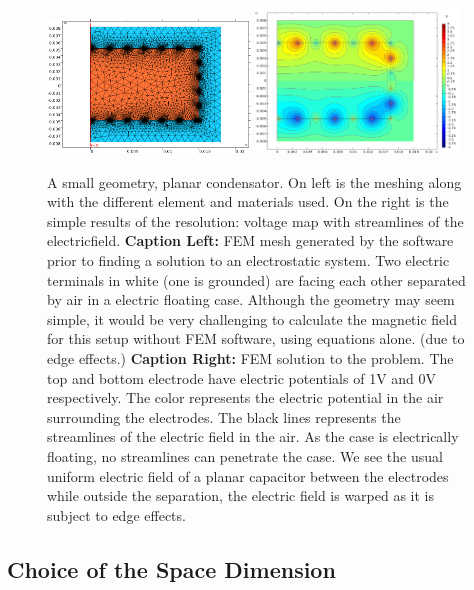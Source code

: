 \begin{figure}
\centering
\includegraphics[width=0.48\textwidth]{Figures/Electrodes/mesh_fid38.png}
\includegraphics[width=0.48\textwidth]{Figures/Electrodes/electric_potential_fid38.png}
\caption{A small geometry, planar condensator. On left is the meshing along with the different element and materials used. On the right is the simple results of the resolution: voltage map with streamlines of the electricfield.
\textbf{Caption Left:} FEM mesh generated by the software prior to finding a solution to an electrostatic system. Two electric terminals in white (one is grounded) are facing each other separated by air in a electric floating  case. Although the geometry may seem simple, it would be very challenging to calculate the magnetic field for this setup without FEM software, using equations alone. (due to edge effects.)
\textbf{Caption Right:} FEM solution to the problem. The top and bottom electrode have electric potentials of 1V and 0V respectively. The color represents the electric potential in the air surrounding the electrodes.  The black lines represents the streamlines of the electric field in the air.  As the case is electrically floating, no streamlines can penetrate the case. We see the usual uniform electric field of a planar capacitor between the electrodes while outside the separation, the electric field is warped as it is subject to edge effects.
}
\label{fig:fid38-mesh}
\end{figure}


\subsection{Choice of the Space Dimension}

